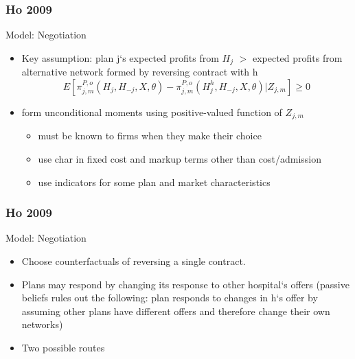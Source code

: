 \documentclass[xcolor=pdftex,dvipsnames,table,mathserif]{beamer}
\begin{document}
\begin{frame}
\frametitle{Ho 2009}

Model: Negotiation
\begin{itemize}
\item Key assumption: plan j`s expected profits from $H_{j}$ $>$ expected profits from alternative network formed by reversing contract with h
\[
E[\pi _{j,m}^{P,o}(H_{j},H_{-j},X,\theta )-\pi
_{j,m}^{P,o}(H_{j}^{h},H_{-j},X,\theta )|Z_{j,m}]\geq 0
\]
\item form unconditional moments using positive-valued function of $Z_{j,m}$
\begin{itemize}
\item must be known to firms when they make their choice
\item use char in fixed cost and markup terms other than cost/admission
\item use indicators for some plan and market characteristics
\end{itemize}

\end{itemize}

\end{frame}

\begin{frame}
\frametitle{Ho 2009}

Model: Negotiation
\begin{itemize}
\item Choose counterfactuals of reversing a single contract.
\item Plans may respond by changing its response to other hospital`s offers (passive beliefs rules out the following: plan responds to changes in h`s offer by assuming other plans have different offers and therefore change their own networks)
\item Two possible routes
\end{itemize}

\end{frame}
\end{document}
